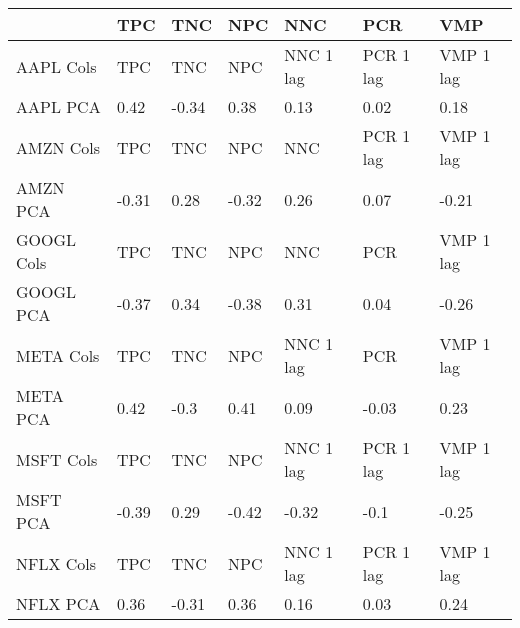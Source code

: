 \begin{tabular}{lllllll}
\toprule
{} &   TPC &   TNC &   NPC &        NNC &        PCR &        VMP \\
\midrule
AAPL Cols  &   TPC &   TNC &   NPC &  NNC 1 lag &  PCR 1 lag &  VMP 1 lag \\
AAPL PCA   &  0.42 & -0.34 &  0.38 &       0.13 &       0.02 &       0.18 \\
AMZN Cols  &   TPC &   TNC &   NPC &        NNC &  PCR 1 lag &  VMP 1 lag \\
AMZN PCA   & -0.31 &  0.28 & -0.32 &       0.26 &       0.07 &      -0.21 \\
GOOGL Cols &   TPC &   TNC &   NPC &        NNC &        PCR &  VMP 1 lag \\
GOOGL PCA  & -0.37 &  0.34 & -0.38 &       0.31 &       0.04 &      -0.26 \\
META Cols  &   TPC &   TNC &   NPC &  NNC 1 lag &        PCR &  VMP 1 lag \\
META PCA   &  0.42 &  -0.3 &  0.41 &       0.09 &      -0.03 &       0.23 \\
MSFT Cols  &   TPC &   TNC &   NPC &  NNC 1 lag &  PCR 1 lag &  VMP 1 lag \\
MSFT PCA   & -0.39 &  0.29 & -0.42 &      -0.32 &       -0.1 &      -0.25 \\
NFLX Cols  &   TPC &   TNC &   NPC &  NNC 1 lag &  PCR 1 lag &  VMP 1 lag \\
NFLX PCA   &  0.36 & -0.31 &  0.36 &       0.16 &       0.03 &       0.24 \\
\bottomrule
\end{tabular}
